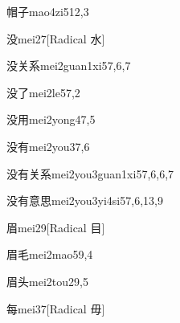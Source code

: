\begin{verbete}{帽子}{mao4zi5}{12,3}
\end{verbete}

\begin{verbete}{没}{mei2}{7}[Radical 水]
\end{verbete}

\begin{verbete}{没关系}{mei2guan1xi5}{7,6,7}
\end{verbete}

\begin{verbete}{没了}{mei2le5}{7,2}
\end{verbete}

\begin{verbete}{没用}{mei2yong4}{7,5}
\end{verbete}

\begin{verbete}{没有}{mei2you3}{7,6}
\end{verbete}

\begin{verbete}{没有关系}{mei2you3guan1xi5}{7,6,6,7}
\end{verbete}

\begin{verbete}{没有意思}{mei2you3yi4si5}{7,6,13,9}
\end{verbete}

\begin{verbete}{眉}{mei2}{9}[Radical 目]
\end{verbete}

\begin{verbete}{眉毛}{mei2mao5}{9,4}
\end{verbete}

\begin{verbete}{眉头}{mei2tou2}{9,5}
\end{verbete}

\begin{verbete}{每}{mei3}{7}[Radical 毋]
\end{verbete}

